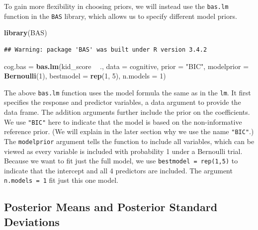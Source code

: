 \documentclass[]{book}
\newenvironment{Shaded}{\begin{snugshade}}{\end{snugshade}}
\newcommand{\KeywordTok}[1]{\textcolor[rgb]{0.13,0.29,0.53}{\textbf{#1}}}
\newcommand{\DataTypeTok}[1]{\textcolor[rgb]{0.13,0.29,0.53}{#1}}
\newcommand{\DecValTok}[1]{\textcolor[rgb]{0.00,0.00,0.81}{#1}}
\newcommand{\StringTok}[1]{\textcolor[rgb]{0.31,0.60,0.02}{#1}}
\newcommand{\OperatorTok}[1]{\textcolor[rgb]{0.81,0.36,0.00}{\textbf{#1}}}
\newcommand{\NormalTok}[1]{#1}
\theoremstyle{definition}
\theoremstyle{definition}
\theoremstyle{definition}
\theoremstyle{remark}
\begin{document}
To gain more flexibility in choosing priors, we will instead use the
\texttt{bas.lm} function in the \texttt{BAS} library, which allows us to
specify different model priors.

\begin{Shaded}
\begin{Highlighting}[]
\KeywordTok{library}\NormalTok{(BAS)}
\end{Highlighting}
\end{Shaded}

\begin{verbatim}
## Warning: package 'BAS' was built under R version 3.4.2
\end{verbatim}

\begin{Shaded}
\begin{Highlighting}[]
\NormalTok{cog.bas =}\StringTok{ }\KeywordTok{bas.lm}\NormalTok{(kid_score }\OperatorTok{~}\StringTok{ }\NormalTok{., }\DataTypeTok{data =}\NormalTok{ cognitive, }\DataTypeTok{prior =} \StringTok{"BIC"}\NormalTok{, }
                 \DataTypeTok{modelprior =} \KeywordTok{Bernoulli}\NormalTok{(}\DecValTok{1}\NormalTok{), }\DataTypeTok{bestmodel =} \KeywordTok{rep}\NormalTok{(}\DecValTok{1}\NormalTok{, }\DecValTok{5}\NormalTok{), }\DataTypeTok{n.models =} \DecValTok{1}\NormalTok{)}
\end{Highlighting}
\end{Shaded}

The above \texttt{bas.lm} function uses the model formula the same as in
the \texttt{lm}. It first specifies the response and predictor
variables, a data argument to provide the data frame. The addition
arguments further include the prior on the coefficients. We use
\texttt{"BIC"} here to indicate that the model is based on the
non-informative reference prior. (We will explain in the later section
why we use the name \texttt{"BIC"}.) The \texttt{modelprior} argument
tells the function to include all variables, which can be viewed as
every variable is included with probability 1 under a Bernoulli trial.
Because we want to fit just the full model, we use
\texttt{bestmodel\ =\ rep(1,5)} to indicate that the intercept and all 4
predictors are included. The argument \texttt{n.models\ =\ 1} fit just
this one model.

\subsection{Posterior Means and Posterior Standard
Deviations}\label{posterior-means-and-posterior-standard-deviations}
\end{document}
